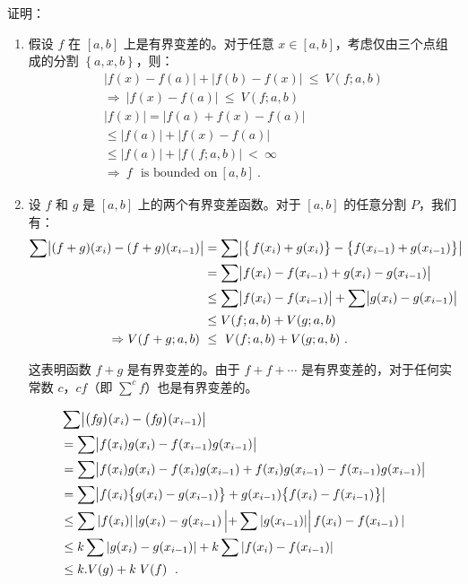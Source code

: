 \begin{example}{证明：}
\begin{enumerate}
\item 假设 $f$ 在 $[a,b]$ 上是有界变差的。对于任意 $x\in[a,b]$，考虑仅由三个点组成的分割 $\left\{a,x,b\right\}$，则：
\begin{align} \left|f(x)-f(a)\right|+\left|f(b)-f(x)\right|\ \leq\ V(f;a,b) \\ \Rightarrow\ \left|f(x)-f(a)\right|\ \leq\ V(f;a,b) \\ \left|f(x)\right|=\left|f(a)+f(x)-f(a)\right| \\ \leq\left|f(a)\right|+\left|f(x)-f(a)\right| \\ \leq\left|f(a)\right|+\left|f(f;a,b)\right|\ <\ \infty \\ \Rightarrow\ f\ \ \ \text{is bounded on}\ [a,b] ~. \end{align}
\item 设 $f$ 和 $g$ 是 $[a,b]$ 上的两个有界变差函数。对于 $[a,b]$ 的任意分割 $P$，我们有：\begin{align} \sum\bigl{|}(f+g)(x_{i})-(f+g)(x_{i-1})\bigr{|}&=\sum\bigl{|}\bigl{\{}\,f(x_{i})+g(x_{i})\bigr{\}}-\bigl{\{}f(x_{i-1})+g(x_{i-1})\bigr{\}}\bigr{|} \\ &=\sum\bigl{|}f(x_{i})-f(x_{i-1})+g(x_{i})-g(x_{i-1})\bigr{|} \\ &\leq\sum\bigl{|}f(x_{i})-f(x_{i-1})\bigr{|}+\sum\bigl{|}g(x_{i})-g(x_{i-1})\bigr{|} \\ &\leq V(f;a,b)+V(g;a,b) \\ \Rightarrow V(f+g;a,b)\ &\leq\ V(f;a,b)+V(g;a,b) ~.\end{align}

这表明函数 $f+g$ 是有界变差的。由于 $f+f+\cdots$ 是有界变差的，对于任何实常数 $c$，$cf$（即 $\sum^c f$）也是有界变差的。

\begin{align} &\sum\bigl{|}\bigl{(}f\!g\bigr{)}(x_{i})-\bigl{(}f\!g\bigr{)}(x_{i-1})\bigr{|} \\ &=\sum\bigl{|}f(x_{i})g(x_{i})-f(x_{i-1})g(x_{i-1})\bigr{|} \\ &=\sum\bigl{|}f(x_{i})g(x_{i})-f(x_{i})g(x_{i-1})+f(x_{i})g(x_{i-1})-f(x_{i-1})g(x_{i-1})\bigr{|} \\ &=\sum\bigl{|}f(x_{i})\bigl{\{}g(x_{i})-g(x_{i-1})\bigr{\}}+g(x_{i-1})\bigl{\{}f(x_{i})-f(x_{i-1})\bigr{\}}\bigr{|}\\&\leq\sum\left|f(x_{i})\right||g(x_{i})-g(x_{i-1})\left|+\sum\left|g(x_{i-1})\right|\right|f(x_{i})-f(x_{i-1})\left|\right. \\ &\leq k\sum\left|g(x_{i})-g(x_{i-1})\right|+k\sum\left|f(x_{i})-f(x_{i-1})\right| \\ &\leq k.V(g)+k\left.V(f)\right. ~.\end{align}
\end{enumerate}
\end{example}
